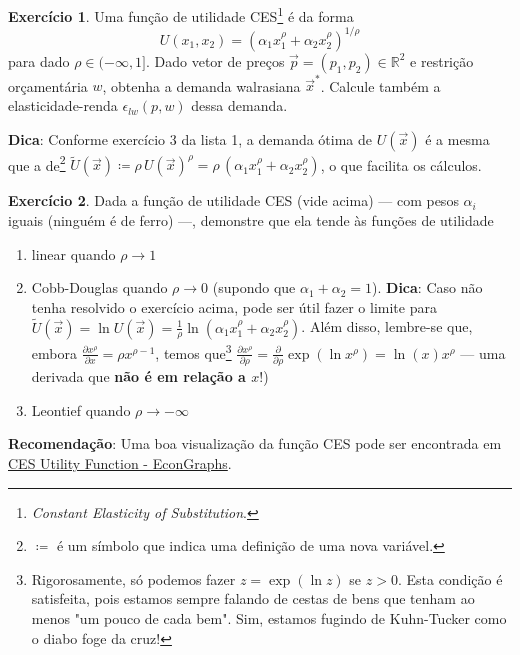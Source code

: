 \documentclass[12pt]{article}
\numberwithin{equation}{section}
\theoremstyle{plain}
\theoremstyle{definition}
\newtheorem{exercise}{Exercício}
\theoremstyle{remark}
\begin{document}
\begin{exercise}
    Uma função de utilidade CES\footnote{\textit{Constant Elasticity of Substitution}.} é da forma \[
    U(x_{1},x_{2}) = (\alpha_{1} x_{1}^\rho + \alpha_{2}x_{2}^\rho)^{1/\rho}
    \] para dado \(\rho \in (-\infty, 1]\). Dado vetor de preços
    \(\vec{p} = (p_{1},p_{2}) \in \mathbb{R}^{2}\) e restrição orçamentária
    \(w\), obtenha a demanda walrasiana \(\vec{x}^*\). Calcule também a elasticidade-renda \(\epsilon_{lw}(p,w)\) dessa demanda.

    \textbf{Dica}: Conforme exercício 3 da lista 1, a demanda ótima de \(U(\vec{x})\) é a mesma que a de\footnote{$\coloneqq$ é um símbolo que indica uma definição de uma nova variável.} \(\tilde{U}(\vec{x}) \coloneqq \rho \, U(\vec{x})^{\rho} = \rho \, (\alpha_{1} x_{1}^\rho + \alpha_{2}x_{2}^\rho)\),
    o que facilita os cálculos.

\end{exercise}

\begin{exercise}
    Dada a função de utilidade CES (vide acima) --- com pesos $\alpha_i$ iguais (ninguém é de ferro) ---, demonstre que ela tende às funções de utilidade 
    \begin{enumerate}
        \item linear quando \(\rho \to 1\)
        \item Cobb-Douglas quando \(\rho \to 0\) (supondo que \(\alpha_{1} + \alpha_{2} = 1\)). \textbf{Dica}: Caso não tenha resolvido o exercício acima, pode ser útil fazer o limite para \(\tilde{U}(\vec{x}) = \ln U(\vec{x}) = \frac{1}{\rho} \ln(\alpha_{1} x_{1}^\rho + \alpha_{2}x_{2}^\rho)\). Além disso, lembre-se que, embora \(\frac{ \partial x^\rho }{ \partial x } = \rho x^{\rho - 1}\), temos que\footnote{Rigorosamente, só podemos fazer $z = \exp(\ln z)$ se $z > 0$. Esta condição é satisfeita, pois estamos sempre falando de cestas de bens que tenham ao menos "um pouco de cada bem". Sim, estamos fugindo de Kuhn-Tucker como o diabo foge da cruz!} \(\frac{ \partial x^\rho }{ \partial \rho } = \frac{ \partial }{ \partial \rho } \exp(\ln x^\rho) = \ln(x) x^\rho\) --- uma derivada que \textbf{não é em relação a \(x\)}!)
    \item Leontief quando \(\rho \to -\infty\)
    \end{enumerate}

    \textbf{Recomendação}: Uma boa visualização da função CES pode ser
    encontrada em
    \href{https://www.econgraphs.org/textbooks/intermediate_micro/scarcity_and_choice/preferences_and_utility/ces.html}{CES
    Utility Function - EconGraphs}.

\end{exercise}
\end{document}
